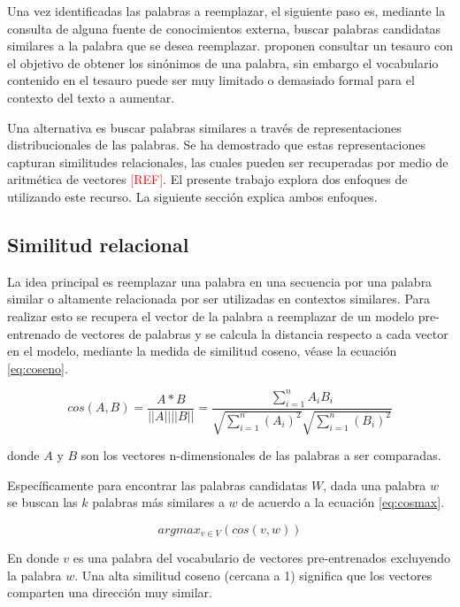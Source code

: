 Una vez identificadas las palabras a reemplazar, el siguiente paso es, mediante la consulta de alguna fuente de conocimientos externa, buscar palabras candidatas similares a la palabra que se desea reemplazar. \cite{zhang2015character} proponen consultar un tesauro con el objetivo de obtener los sinónimos de una palabra, sin embargo el vocabulario contenido en el tesauro puede ser muy limitado o demasiado formal para el contexto del texto a aumentar. 

Una alternativa es buscar palabras similares a través de representaciones distribucionales de las palabras. Se ha demostrado que estas representaciones capturan  similitudes relacionales, las cuales pueden ser recuperadas por medio de aritmética de vectores \textcolor{red}{[REF]}. El presente trabajo explora dos enfoques de utilizando este recurso. La siguiente sección explica ambos enfoques. 

\subsection{Similitud relacional}
La idea principal es reemplazar una palabra en una secuencia por una palabra similar o altamente relacionada por ser utilizadas en contextos similares. Para realizar esto se recupera el vector de la palabra a reemplazar de un modelo pre-entrenado de vectores de palabras y se calcula la distancia respecto a cada vector en el modelo,  mediante la medida de similitud coseno, véase la ecuación \ref{eq:coseno}.

\begin{equation}
\label{eq:coseno}
    cos(A,B)=\frac{A*B}{||A||||B||} = \frac{\sum_{i=1}^{n}A_i B_i}{\sqrt{\sum_{i=1}^{n}(A_i)^2} \sqrt{\sum_{i=1}^{n}(B_i)^2} }
\end{equation}

donde $A$ y $B$ son los vectores n-dimensionales de las palabras a ser comparadas.

Específicamente para encontrar las palabras candidatas $W$, dada una palabra $w$ se buscan las $k$ palabras más similares a $w$ de acuerdo a la ecuación \ref{eq:cosmax}.

\begin{equation}
    \label{eq:cosmax}
    argmax_{v \in V} (cos(v, w))
\end{equation}

En donde $v$ es una palabra del vocabulario de vectores pre-entrenados excluyendo la palabra $w$. Una alta similitud coseno (cercana a 1) significa que los vectores comparten una dirección muy similar.

